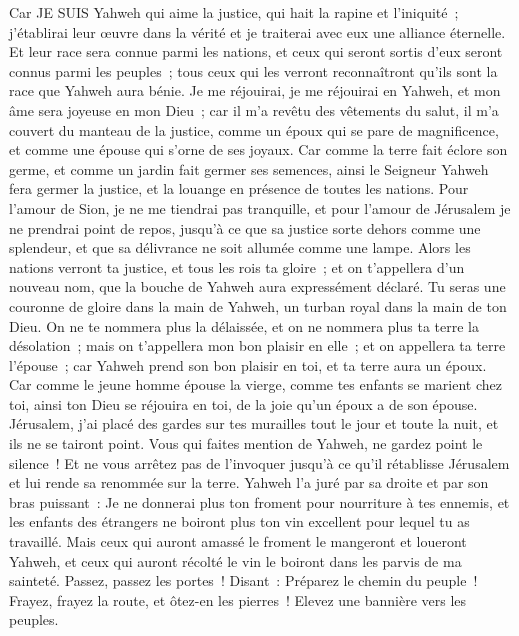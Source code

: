 \begin{multicols}{2}
Car JE SUIS Yahweh qui aime la justice, qui hait la rapine et l'iniquité~; j'établirai leur œuvre dans la vérité et je traiterai avec eux une alliance éternelle.
Et leur race sera connue parmi les nations, et ceux qui seront sortis d'eux seront connus parmi les peuples~; tous ceux qui les verront reconnaîtront qu'ils sont la race que Yahweh aura bénie.
Je me réjouirai, je me réjouirai en Yahweh, et mon âme sera joyeuse en mon Dieu~; car il m'a revêtu des vêtements du salut, il m'a couvert du manteau de la justice, comme un époux qui se pare de magnificence, et comme une épouse qui s'orne de ses joyaux.
Car comme la terre fait éclore son germe, et comme un jardin fait germer ses semences, ainsi le Seigneur Yahweh fera germer la justice, et la louange en présence de toutes les nations.
\VerseOne{}Pour l'amour de Sion, je ne me tiendrai pas tranquille, et pour l'amour de Jérusalem je ne prendrai point de repos, jusqu'à ce que sa justice sorte dehors comme une splendeur, et que sa délivrance ne soit allumée comme une lampe.
Alors les nations verront ta justice, et tous les rois ta gloire~; et on t'appellera d'un nouveau nom, que la bouche de Yahweh aura expressément déclaré.
Tu seras une couronne de gloire dans la main de Yahweh, un turban royal dans la main de ton Dieu.
On ne te nommera plus la délaissée, et on ne nommera plus ta terre la désolation~; mais on t'appellera mon bon plaisir en elle~; et on appellera ta terre l'épouse~; car Yahweh prend son bon plaisir en toi, et ta terre aura un époux.
Car comme le jeune homme épouse la vierge, comme tes enfants se marient chez toi, ainsi ton Dieu se réjouira en toi, de la joie qu'un époux a de son épouse.
Jérusalem, j'ai placé des gardes sur tes murailles tout le jour et toute la nuit, et ils ne se tairont point. Vous qui faites mention de Yahweh, ne gardez point le silence~!
Et ne vous arrêtez pas de l'invoquer jusqu'à ce qu'il rétablisse Jérusalem et lui rende sa renommée sur la terre.
Yahweh l'a juré par sa droite et par son bras puissant~: Je ne donnerai plus ton froment pour nourriture à tes ennemis, et les enfants des étrangers ne boiront plus ton vin excellent pour lequel tu as travaillé.
Mais ceux qui auront amassé le froment le mangeront et loueront Yahweh, et ceux qui auront récolté le vin le boiront dans les parvis de ma sainteté.
Passez, passez les portes~! Disant~: Préparez le chemin du peuple~! Frayez, frayez la route, et ôtez-en les pierres~! Elevez une bannière vers les peuples.

\end{multicols}
